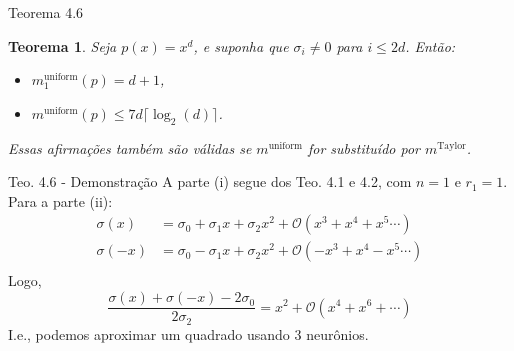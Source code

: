 \documentclass{beamer}
\newtheorem{teo}{Teorema}[section]
\theoremstyle{definition}
\begin{document}
\begin{frame}{Teorema 4.6}
    \begin{teo}
        Seja $p(x) = x^d$, e suponha que $\sigma_i \neq 0$ para $i \leq 2d$. Então:
    \begin{itemize}

    \item[(i)] $m_1^{\text{uniform}}(p) = d + 1$,
    \item[(ii)] $m^{\text{uniform}}(p) \leq 7d\lceil \log_2(d) \rceil$.
    \end{itemize}

    Essas afirmações também são válidas se $m^{\text{uniform}}$ for substituído por $m^{\text{Taylor}}$.

    \end{teo}
\end{frame}

\begin{frame}{Teo. 4.6 - Demonstração}
    A parte (i) segue dos Teo. 4.1 e 4.2, com $n=1$ e $r_1=1$. \pause Para a parte (ii):
    \begin{align*}
        \sigma(x) &= \sigma_0 + \sigma_1 x + \sigma_2 x^2 + \mathcal{O} (x^3 + x^4 + x^5 \cdots) \\
        \sigma(-x) &= \sigma_0 - \sigma_1 x + \sigma_2 x^2 + \mathcal{O} (-x^3 + x^4 - x^5 \cdots) \\
    \end{align*}
    \pause Logo,
    \begin{equation*}
        \frac{\sigma(x) + \sigma(-x) - 2\sigma_0}{2\sigma_2} = x^2 + \mathcal{O}(x^4+x^6 + \cdots)
    \end{equation*}
    \pause I.e., podemos aproximar um quadrado usando 3 neurônios.
\end{frame}
\end{document}
